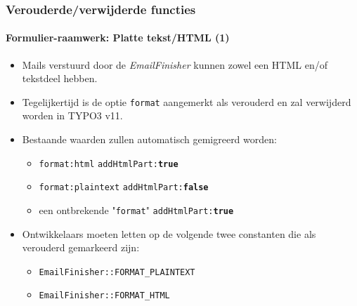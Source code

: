 
\begin{frame}[fragile]
	\frametitle{Verouderde/verwijderde functies}
	\framesubtitle{Formulier-raamwerk: Platte tekst/HTML (1)}

	\begin{itemize}
		\item Mails verstuurd door de \textit{EmailFinisher} kunnen zowel een HTML en/of tekstdeel hebben.

		\item Tegelijkertijd is de optie \texttt{format} aangemerkt als verouderd en zal verwijderd worden in TYPO3 v11.

		\item Bestaande waarden zullen automatisch gemigreerd worden:

			\begin{itemize}\smaller
				\item \texttt{format:html} \tabto{3cm}\textrightarrow\hspace{0.1cm}\texttt{addHtmlPart:\textbf{true}}
				\item \texttt{format:plaintext} \tabto{3cm}\textrightarrow\hspace{0.1cm}\texttt{addHtmlPart:\textbf{false}}
				\item een ontbrekende "\texttt{format}" \tabto{3cm}\textrightarrow\hspace{0.1cm}\texttt{addHtmlPart:\textbf{true}}
			\end{itemize}\normalsize

		\item Ontwikkelaars moeten letten op de volgende twee constanten die als verouderd gemarkeerd zijn:

			\begin{itemize}\smaller
				\item \texttt{EmailFinisher::FORMAT\_PLAINTEXT}
				\item \texttt{EmailFinisher::FORMAT\_HTML}
			\end{itemize}\normalsize

	\end{itemize}

\end{frame}


